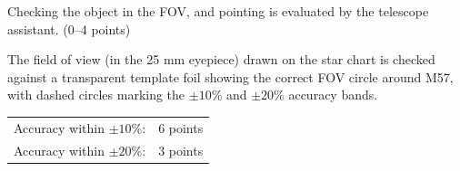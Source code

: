 Checking the object in the FOV, and pointing is evaluated by the telescope
assistant. \hfill(0--4 points)

The field of view (in the 25 mm eyepiece) drawn on the star chart is checked
against a transparent template foil showing the correct FOV circle around
M57, with dashed circles marking the $\pm 10$\% and $\pm 20$\% accuracy
bands.


\begin{center}
\begin{tabular}{ll}
Accuracy within $\pm 10$\%: & 6 points \\
Accuracy within $\pm 20$\%: & 3 points \\
\end{tabular}
\end{center}
